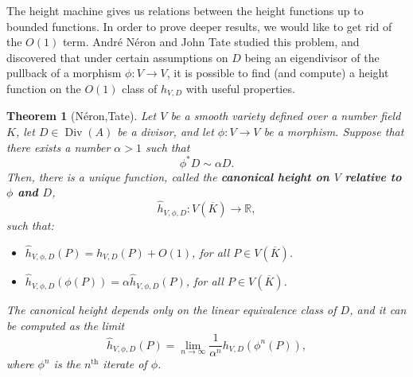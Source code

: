 \documentclass[a4paper, 12pt]{amsart}
\theoremstyle{definition}
\theoremstyle{plain}
\theoremstyle{plain}
\newtheorem{thm0}[defn0]{Theorem}
\theoremstyle{plain}
\theoremstyle{plain}
\theoremstyle{remark}
\theoremstyle{remark}
\theoremstyle{plain}
\newenvironment{theorem}{ \begin{thm0}}{\end{thm0}}
\DeclareMathOperator{\Div}{Div}
\begin{document}
	The height machine gives us relations between the height functions up to bounded functions. In order to prove deeper results, we would like to get rid of the $O(1)$ term. André Néron and John Tate studied this problem, and discovered that under certain assumptions on $D$ being an eigendivisor of the pullback of a morphism $\phi:V\rightarrow V$, it is possible to find (and compute) a height function on the $O(1)$ class of $h_{V,D}$ with useful properties.
	
	\begin{theorem}[Néron,Tate]\label{canonicalheight}
		Let $V$ be a smooth variety defined over a number field $K$, let $D\in\Div(A)$ be a divisor, and let $\phi:V\rightarrow V$ be a morphism. Suppose that there exists a number $\alpha>1$ such that
		\begin{equation*}
			\phi^*D\sim\alpha D.
		\end{equation*}
		Then, there is a unique function, called the \textbf{canonical height on $V$ relative to $\phi$ and $D$},
		\begin{equation*}
			\hat{h}_{V,\phi,D}:V(\overline{K})\rightarrow\mathbb{R},
		\end{equation*}
		such that:
		\begin{itemize}
			\item[(a)]$\hat{h}_{V,\phi,D}(P)=h_{V,D}(P)+O(1)$, for all $P\in V(\overline{K})$.
			\item[(b)]$\hat{h}_{V,\phi,D}(\phi(P))=\alpha\hat{h}_{V,\phi,D}(P)$, for all $P\in V(\overline{K})$.
		\end{itemize}
		The canonical height depends only on the linear equivalence class of $D$, and it can be computed as the limit
		\begin{equation*}
			\hat{h}_{V,\phi,D}(P)=\lim\limits_{n\to\infty}\frac{1}{\alpha^n}h_{V,D}(\phi^n(P)),
		\end{equation*}
		where $\phi^n$ is the $n^\text{th}$ iterate of $\phi$.
	\end{theorem}
\end{document}
